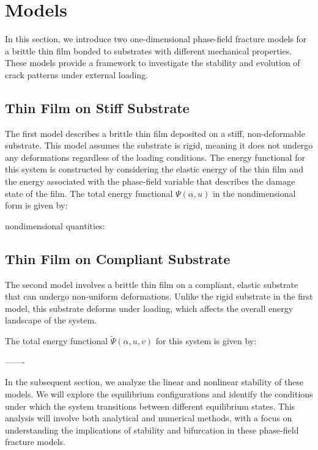 \section{Models}

In this section, we introduce two one-dimensional phase-field fracture models for a brittle thin film bonded to substrates with different mechanical properties. These models provide a framework to investigate the stability and evolution of crack patterns under external loading.

\subsection{Thin Film on Stiff Substrate}
\label{sec:thin_film_stiff}

The first model describes a brittle thin film deposited on a stiff, non-deformable substrate. This model assumes the substrate is rigid, meaning it does not undergo any deformations regardless of the loading conditions. The energy functional for this system is constructed by considering the elastic energy of the thin film and the energy associated with the phase-field variable that describes the damage state of the film.
\newcommand{\Estiff}{\Psi}
\newcommand{\Ecompl}{\widetilde\Psi}
The total energy functional $\Estiff(\alpha, u)$ in the nondimensional form is given by:

nondimensional quantities:

\subsection{Thin Film on Compliant Substrate}
\label{sec:thin_film_compliant}
The second model involves a brittle thin film on a compliant, elastic substrate that can undergo non-uniform deformations. Unlike the rigid substrate in the first model, this substrate deforms under loading, which affects the overall energy landscape of the system.

The total energy functional $\Ecompl(\alpha, u, v)$ for this system is given by:







-------


In the subsequent section, we analyze the linear and nonlinear stability of these models. We will explore the equilibrium configurations and identify the conditions under which the system transitions between different equilibrium states. This analysis will involve both analytical and numerical methods, with a focus on understanding the implications of stability and bifurcation in these phase-field fracture models.